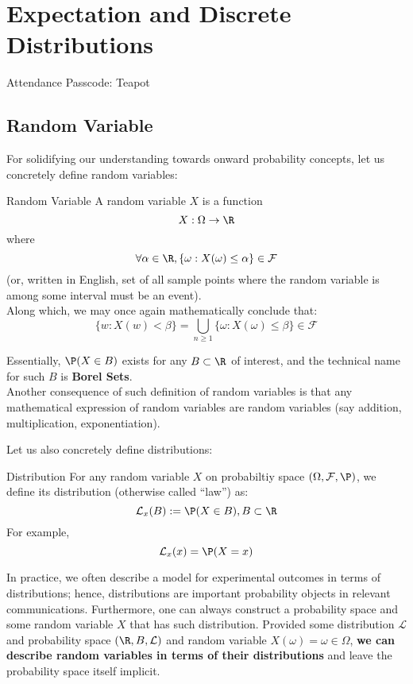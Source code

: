 \chapter{Expectation and Discrete Distributions}
Attendance Passcode: Teapot

\section{Random Variable}
For solidifying our understanding towards onward probability concepts, let us concretely define random variables:
\begin{ln-define}{Random Variable}{}
    A random variable $X$ is a function
    \[ X: \Omega \rightarrow \R \]
    where
    \[\forall \alpha \in \R, \{\omega : X(\omega) \leq \alpha\} \in \mathcal{F}\]
    (or, written in English, set of all sample points where the random variable is among some interval must be an event). \\
    Along which, we may once again mathematically conclude that:
    \[
        \{w : X(w) < \beta\} = \bigcup_{n \geq 1} \{\omega : X(\omega) \leq \beta\} \in \mathcal{F}
    \]
\end{ln-define}
Essentially, $\P(X \in B)$ exists for any $B \subset \R$ of interest, and the technical name for such $B$ is \textbf{Borel Sets}. \\
Another consequence of such definition of random variables is that any mathematical expression of random variables are random variables (say addition, multiplication, exponentiation).

Let us also concretely define distributions:
\begin{ln-define}{Distribution}{}
    For any random variable $X$ on probabiltiy space $(\Omega, \mathcal{F}, \P)$, we define its distribution (otherwise called ``law'') as:
    \[
        \mathcal{L}_x (B) := \P(X \in B), B \subset \R
    \]
    For example,
    \[
        \mathcal{L}_x (x) = \P(X = x)
    \]
\end{ln-define}
In practice, we often describe a model for experimental outcomes in terms of distributions; hence, distributions are important probability objects in relevant communications. 
Furthermore, one can always construct a probability space and some random variable $X$ that has such distribution.
Provided some distribution $\mathcal{L}$ and probability space $(\R, B, \mathcal{L})$ and random variable $X(\omega) = \omega \in \Omega$, \textbf{we can describe random variables in terms of their distributions} and leave the probability space itself implicit. \\


